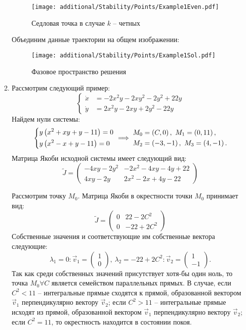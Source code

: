 \begin{enumerate}
\begin{multicols}{2}
				\columnbreak

					\begin{figure}[H]
						\centering
						\texttt{[image: additional/Stability/Points/Example1Even.pdf]}
						\caption{Седловая точка в случае $k$ -- четных}
						\label{Stability:Example1Even}
					\end{figure}

				\end{multicols}
				Объединим данные траектории на общем изображении:
				\begin{figure}[H]
					\centering
					\texttt{[image: additional/Stability/Points/Example1Sol.pdf]}
					\caption{Фазовое пространство решения}
					\label{Stability:Example1Sol}
				\end{figure}

			\item Рассмотрим следующий пример:
				\[ \left\lbrace \begin{split}
					\dot{x} &= - 2 x^2 y - 2 x y^2 - 2 y^2 + 22 y \\
					\dot{y} &= 2 x^2 y - 2 x y + 2 y^2 - 22 y
				\end{split} \right. \]
				Найдем нули системы:
				\[ 
					\left\lbrace \begin{aligned} 
						&y \left( x^2 + xy + y - 11 \right) = 0 \\ &y \left( x^2 - x + y - 11 \right) = 0 
					 \end{aligned} \right. \implies \begin{split} 
						&M_0 = \left( C, 0 \right), ~ M_1 = \left( 0, 11 \right), \\ 
						&M_2 = \left( -3, -1 \right), ~ M_3 = \left( 4, -1 \right). 
					\end{split} 
				\]
				Матрица Якоби исходной системы имеет следующий вид: 
				\[
					\tilde{J} = \begin{pmatrix}
						- 4xy - 2y^2 & - 2 x^2 - 4xy - 4y + 22 \\ 
						4xy - 2y & 2 x^2 - 2x + 4y - 22
					\end{pmatrix}
				\]

				Рассмотрим точку $M_0$. Матрица Якоби в окрестности точки $M_0$ принимает вид:
				\[
					\tilde{J} = \begin{pmatrix}
						0 & 22 - 2C^2 \\
						0 & -22 + 2C^2
					\end{pmatrix}
				\]
				Собственные значения и соответствующие им собственные вектора следующие:
				\[ \lambda_1 = 0: \vec{v}_1 = \begin{pmatrix} 1 \\ 0 \end{pmatrix}, ~ \lambda_2 = -22 + 2C^2: \vec{v}_2 = \begin{pmatrix} 1 \\ -1 \end{pmatrix}. \]
				Так как среди собственных значений присутствует хотя-бы один ноль, то точка $M_0 \forall C$ является семейством параллельных прямых. В случае, если $C^2 < 11$ -- интегральные прямые сходятся к прямой, образованной вектором $\vec{v}_1$ перпендикулярно вектору $\vec{v}_2$; если $C^2 > 11$ -- интегральные прямые исходят из прямой, образованной вектором $\vec{v}_1$ перпендикулярно вектору $\vec{v}_2$; если $C^2 = 11$, то окрестность находится в состоянии покоя.


\end{enumerate}
